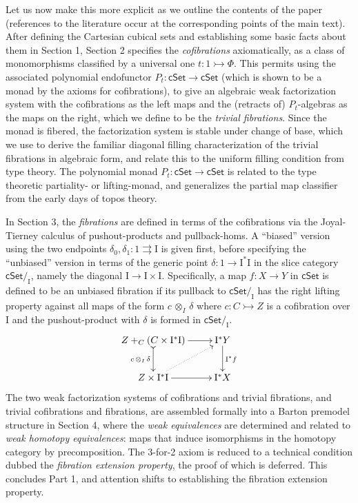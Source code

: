 \documentclass[11pt,reqno]{amsart}
\newcommand{\cSet}{\ensuremath{\mathsf{cSet}}}
\newcommand{\mono}{\ensuremath{\rightarrowtail}}
\newcommand{\cof}{\ensuremath{\rightarrowtail}}
\renewcommand{\to}{\ensuremath{\rightarrow}}
\newcommand{\I}{\ensuremath{\mathrm{I}}}
\theoremstyle{remark}
\theoremstyle{definition}
\begin{document}
Let us now make this more explicit as we outline the contents of the paper (references to the literature occur at the corresponding points of the main text).
After defining the Cartesian cubical sets and establishing some basic facts about them in Section 1, Section 2  specifies the \emph{cofibrations} axiomatically, as a class of monomorphisms classified by a universal one $t:1 \cof \Phi$.  This permits using the associated polynomial endofunctor $P_t : \cSet\to \cSet$ (which is shown to be a monad by the axioms for cofibrations), to give an algebraic weak factorization system with the cofibrations as the left maps and the (retracts of) $P_t$-algebras as the maps on the right, which we define to be the \emph{trivial fibrations}.  Since the monad is fibered, the factorization system is stable under change of base, which we use to derive the familiar diagonal filling characterization of the trivial fibrations in algebraic form, and relate this to the uniform filling condition from type theory.  The polynomial monad $P_t : \cSet\to \cSet$ is related to the type theoretic partiality- or lifting-monad, and generalizes the partial map classifier from the early days of topos theory.

In Section 3, the \emph{fibrations} are defined in terms of the cofibrations via the Joyal-Tierney calculus of pushout-products and pullback-homs.  A ``biased'' version using the two endpoints $\delta_0, \delta_1: 1\rightrightarrows\I$ is given first, before specifying the ``unbiased''  version in terms of the generic point $\delta : 1 \to \I^*\I$  in the slice category $\cSet/_\I$, namely the diagonal $\I \to \I\times\I$.  Specifically, a map $f : X \to Y$ in $\cSet$ is defined to be an unbiased fibration if its pullback to $\cSet/_\I$ has the right lifting property against all maps of the form $c\, \otimes_I\, \delta$ where $c : C\mono Z$ is a cofibration over $\I$ and the pushout-product with $\delta$ is formed in $\cSet/_\I$. 
\begin{equation*}\label{diagram:unbiasedfibrationIntro}
\xymatrix{
Z +_C (C\times\I^*\I) \ar@{>->}[d]_{c\, \otimes_I\, \delta} \ar[r] & \I^*Y \ar[d]^{\I^*f} \\
Z\times \I^*\I \ar@{.>}[ru] \ar[r] & \I^*X
}
\end{equation*}
%
The two weak factorization systems of cofibrations and trivial fibrations, and trivial cofibrations and fibrations, are assembled formally into a Barton premodel structure in Section 4, where the \emph{weak equivalences} are determined and related to \emph{weak homotopy equivalences}:  maps that induce isomorphisms in the homotopy category by precomposition.  The 3-for-2 axiom is reduced to a technical condition dubbed the \emph{fibration extension property}, the proof of which is deferred.  This concludes Part 1, and attention shifts to establishing the fibration extension property.
\end{document}
